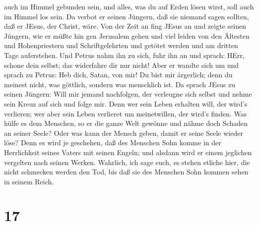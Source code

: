 auch im Himmel gebunden sein, und alles, was du auf Erden lösen wirst,
soll auch im Himmel los sein.  Da verbot er seinen Jüngern,
daß sie niemand sagen sollten, daß er JEsus, der Christ, wäre.
 Von der Zeit an fing JEsus an und zeigte seinen Jüngern,
wie er müßte hin gen Jerusalem gehen und viel leiden von den Ältesten
und Hohenpriestern und Schriftgelehrten und getötet werden und am
dritten Tage auferstehen.  Und Petrus nahm ihn zu sich,
fuhr ihn an und sprach: HErr, schone dein selbst; das widerfahre dir nur
nicht!  Aber er wandte sich um und sprach zu Petrus: Heb
dich, Satan, von mir! Du bist mir ärgerlich; denn du meinest nicht, was
göttlich, sondern was menschlich ist.  Da sprach JEsus zu
seinen Jüngern: Will mir jemand nachfolgen, der verleugne sich selbst
und nehme sein Kreuz auf sich und folge mir.  Denn wer sein
Leben erhalten will, der wird's verlieren; wer aber sein Leben verlieret
um meinetwillen, der wird's finden.  Was hülfe es dem
Menschen, so er die ganze Welt gewönne und nähme doch Schaden an seiner
Seele? Oder was kann der Mensch geben, damit er seine Seele wieder löse?
 Denn es wird je geschehen, daß des Menschen Sohn komme in
der Herrlichkeit seines Vaters mit seinen Engeln; und alsdann wird er
einem jeglichen vergelten nach seinen Werken.  Wahrlich,
ich sage euch, es stehen etliche hier, die nicht schmecken werden den
Tod, bis daß sie des Menschen Sohn kommen sehen in seinem Reich.

\hypertarget{section-16}{%
\section{17}\label{section-16}}

